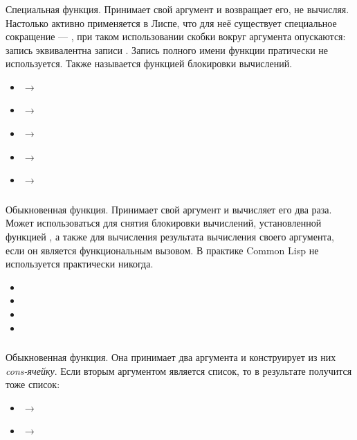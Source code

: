 \documentclass[a4paper, 12pt, titlepage, twoside]{article}
\newenvironment{examples}
               {\begin{itemize}\renewcommand{\labelitemi}{ }}
               {\end{itemize}}
\begin{document}
\subsubsection{}
Специальная функция. Принимает свой аргумент и возвращает его, не вычисляя. Настолько активно применяется в Лиспе, что для неё существует специальное сокращение --- , при таком использовании скобки вокруг аргумента опускаются: запись  эквивалентна записи . Запись полного имени функции пратически не используется. Также называется функцией блокировки вычислений.
\begin{examples}
\item {} $\longrightarrow$ 
\item {} $\longrightarrow$ 
\item {} $\longrightarrow$ 
\item {} $\longrightarrow$ 
\item {} $\longrightarrow$ 
\end{examples}
\subsubsection{}
Обыкновенная функция. Принимает свой аргумент и вычисляет его два раза. Может использоваться для снятия блокировки вычислений, установленной функцией , а также для вычисления результата вычисления своего аргумента, если он является функциональным вызовом. В практике Common Lisp не используется практически никогда.
\begin{examples}
\item {}
\item {}
\item {}
\item {}
\end{examples}
\subsubsection{}
Обыкновенная функция. Она принимает два аргумента и конструирует из них \textit{cons-ячейку}. Если вторым аргументом  является список, то в результате получится тоже список:
\begin{examples}
  \item {} $\longrightarrow$ 
  \item {} $\longrightarrow$ 
\end{examples}
\end{document}
